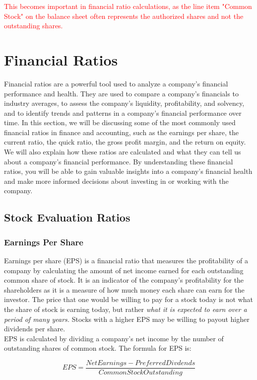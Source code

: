 \documentclass{article}
\begin{document}
\textcolor{red}{This becomes important in financial ratio calculations, as the line item "Common Stock" on the balance sheet often represents the authorized shares and not the outstanding shares.}




\section{Financial Ratios}
Financial ratios are a powerful tool used to analyze a company's financial performance and health. They are used to compare a company's financials to industry averages, to assess the company's liquidity, profitability, and solvency, and to identify trends and patterns in a company's financial performance over time. In this section, we will be discussing some of the most commonly used financial ratios in finance and accounting, such as the earnings per share, the current ratio, the quick ratio, the gross profit margin, and the return on equity. We will also explain how these ratios are calculated and what they can tell us about a company's financial performance. By understanding these financial ratios, you will be able to gain valuable insights into a company's financial health and make more informed decisions about investing in or working with the company.
\subsection{Stock Evaluation Ratios}
\subsubsection{Earnings Per Share}
Earnings per share (EPS) is a financial ratio that measures the profitability of a company by calculating the amount of net income earned for each outstanding common share of stock. It is an indicator of the company's profitability for the shareholders as it is a measure of how much money each share can earn for the investor. The price that one would be willing to pay for a stock today is not what the share of stock is earning today, but rather \textit{what it is expected to earn over a period of many years.} Stocks with a higher EPS may be willing to payout higher dividends per share. \\

EPS is calculated by dividing a company's net income by the number of outstanding shares of common stock. The formula for EPS is:

\begin{equation}
    EPS = \frac{Net Earnings - PreferredDivdends}{Common Stock Outstanding}
\end{equation}\\
\end{document}
